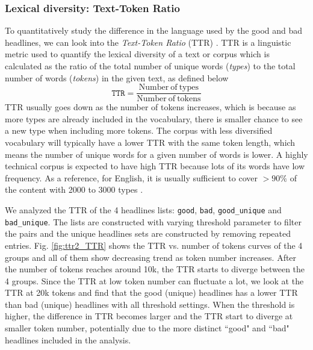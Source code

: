 \documentclass[%
preprint,
 amsmath,amssymb,
 aps,
]{revtex4-2}
\begin{document}
\subsubsection{Lexical diversity: Text-Token Ratio}

To quantitatively study the difference in the language used by the good and bad headlines, we can look into the \textit{Text-Token Ratio} (TTR) \cite{jurafskyspeech}.
TTR is a linguistic metric used to quantify the lexical diversity of a text or corpus which is calculated as the ratio of the total number of unique words (\textit{types}) to the total number of words (\textit{tokens}) in the given text, as defined below
\begin{equation}
    \texttt{TTR} = \frac{\mathrm{Number\ of\ types}}{\mathrm{Number\ of\ tokens}}
\end{equation}
TTR usually goes down as the number of tokens increases, which is because as more types are already included in the vocabulary, there is smaller chance to see a new type when including more tokens.
The corpus with less diversified vocabulary will typically have a lower TTR with the same token length, which means the number of unique words for a given number of words is lower.
A highly technical corpus is expected to have high TTR because lots of its words have low frequency.
As a reference, for English, it is usually sufficient to cover \(>90\%\) of the content with 2000 to 3000 types \cite{nagy1984many}.

We analyzed the TTR of the 4 headlines lists: \texttt{good}, \texttt{bad}, \texttt{good\_unique} and \texttt{bad\_unique}.
The lists are constructed with varying threshold parameter to filter the pairs and the unique headlines sets are constructed by removing repeated entries.
Fig. \ref{fig:ttr2_TTR} shows the TTR vs. number of tokens curves of the 4 groups and all of them show decreasing trend as token number increases. 
After the number of tokens reaches around 10k, the TTR starts to diverge between the 4 groups.
Since the TTR at low token number can fluctuate a lot, we look at the TTR at 20k tokens and find that the good (unique) headlines has a lower TTR than bad (unique) headlines with all threshold settings.
When the threshold is higher, the difference in TTR becomes larger and the TTR start to diverge at smaller token number, potentially due to the more distinct ``good" and ``bad" headlines included in the analysis.
\end{document}

